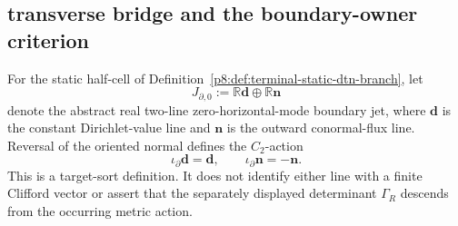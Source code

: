 \documentclass[12pt,a4paper]{article}
\begin{document}
\subsection{transverse bridge and the boundary-owner criterion}
\label{p8:sec:v166-transverse-bridge-boundary-owner}

\begin{definition}
\label{p8:def:v166-zero-mode-boundary-jet}
For the static half-cell of
Definition~\ref{p8:def:terminal-static-dtn-branch}, let
\[
 J_{\partial,0}
 :=\mathbb R\mathbf d\oplus\mathbb R\mathbf n
\]
denote the abstract real two-line zero-horizontal-mode boundary jet, where
\(\mathbf d\) is the constant Dirichlet-value line and \(\mathbf n\) is the
outward conormal-flux line.  Reversal of the oriented normal defines the
\(C_2\)-action
\[
 \iota_\partial\mathbf d=\mathbf d,
 \qquad
 \iota_\partial\mathbf n=-\mathbf n.
\]
This is a target-sort definition.  It does not identify either line with a
finite Clifford vector or assert that the separately displayed determinant
\(\Gamma_R\) descends from the occurring metric action.
\end{definition}
\end{document}
